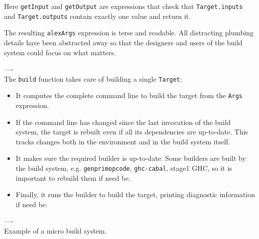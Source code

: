 Here \texttt{getInput} and \texttt{getOutput} are expressions that check that
\texttt{Target.inputs} and \texttt{Target.outputs} contain exactly one value and
return it.

The resulting \texttt{alexArgs} expression is terse and readable. All
distracting plumbing details have been abstracted away so that the
designers and users of the build system could focus on what matters.

\noindent ----\\
\noindent The \texttt{build} function takes care of building a single
\texttt{Target}:
\begin{itemize}
  \item It computes the complete command line to build the target from the
  \texttt{Args} expression.
  \item If the command line has changed since the last invocation of the build
  system, the target is rebuilt even if all its dependencies are up-to-date.
  This tracks changes both in the environment and in the build system itself.
  \item It makes sure the required builder is up-to-date. Some builders are
  built by the build system, e.g. \texttt{genprimopcode}, \texttt{ghc-cabal},
  stage1 GHC, so it is important to rebuild them if need be.
  \item Finally, it runs the builder to build the target, printing diagnostic
  information if need be.
\end{itemize}

\noindent ----\\
\noindent Example of a micro build system.

